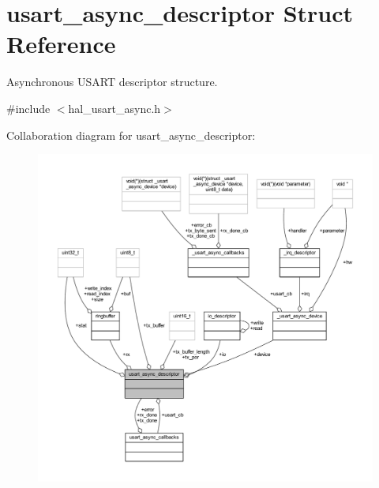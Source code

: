 \hypertarget{structusart__async__descriptor}{}\section{usart\+\_\+async\+\_\+descriptor Struct Reference}
\label{structusart__async__descriptor}


Asynchronous U\+S\+A\+RT descriptor structure.  




{\ttfamily \#include $<$hal\+\_\+usart\+\_\+async.\+h$>$}



Collaboration diagram for usart\+\_\+async\+\_\+descriptor\+:
\nopagebreak
\begin{figure}[H]
\begin{center}
\leavevmode
\includegraphics[width=350pt]{structusart__async__descriptor__coll__graph}
\end{center}
\end{figure}
